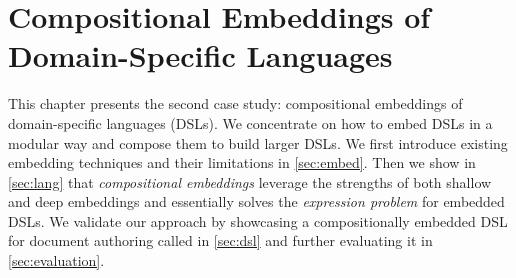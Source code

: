\chapter{Compositional Embeddings of Domain-Specific Languages} \label{ch:embedding}

This chapter presents the second case study: compositional embeddings of
domain-specific languages (DSLs). We concentrate on how to embed DSLs in a
modular way and compose them to build larger DSLs. We first introduce existing
embedding techniques and their limitations in \autoref{sec:embed}. Then we show
in \autoref{sec:lang} that \emph{compositional embeddings} leverage the
strengths of both shallow and deep embeddings and essentially solves the
\emph{expression problem} for embedded DSLs. We validate our approach by
showcasing a compositionally embedded DSL for document authoring called \ExT in
\autoref{sec:dsl} and further evaluating it in \autoref{sec:evaluation}.





